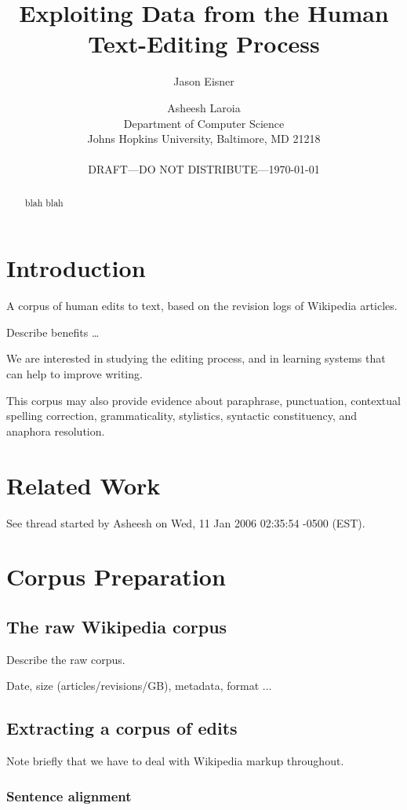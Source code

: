 \documentclass[11pt]{article}
\title{Exploiting Data from the Human Text-Editing Process}
\author{Jason Eisner \and Asheesh Laroia \\
	Department of Computer Science \\
	Johns Hopkins University, Baltimore, MD 21218 \\ ~\\
        DRAFT---DO NOT DISTRIBUTE---\today}
\begin{document}
\maketitle
\begin{abstract}
blah blah 
\end{abstract}

\section{Introduction}

A corpus of human edits to text, based on the revision logs of
Wikipedia articles.  

Describe benefits \ldots

We are interested in studying the editing process, and in learning
systems that can help to improve writing.  

This corpus may also provide evidence about paraphrase, punctuation,
contextual spelling correction, grammaticality, stylistics, syntactic
constituency, and anaphora resolution.

\section{Related Work}

See thread started by Asheesh on Wed, 11 Jan 2006 02:35:54 -0500 (EST).

\section{Corpus Preparation}

\subsection{The raw Wikipedia corpus}

Describe the raw corpus.

Date, size (articles/revisions/GB), metadata, format ...

\subsection{Extracting a corpus of edits}

Note briefly that we have to deal with Wikipedia markup throughout.

\subsubsection{Sentence alignment}
\end{document}
